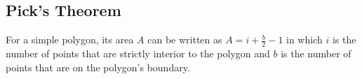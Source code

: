 \subsection{Pick's Theorem}
For a simple polygon, its area $A$ can be written as $A = i + \frac b2 - 1$ in which $i$ is the number of points that are strictly interior to the polygon and $b$ is the number of points that are on the polygon's boundary.
